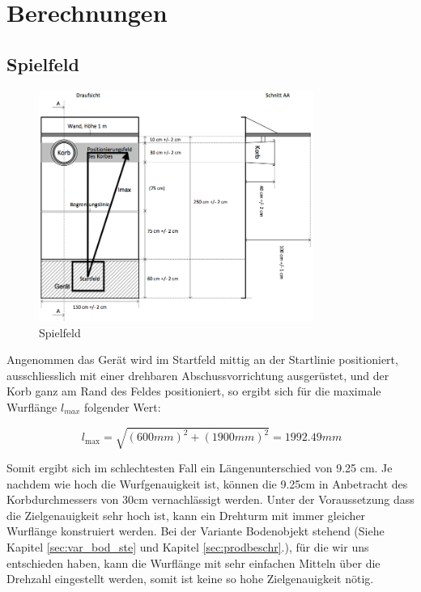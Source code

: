 \section{Berechnungen}
\label{sec:calc}

\subsection{Spielfeld}
\begin{figure}[h!]          
    \centering             
    \includegraphics[width=0.8\textwidth]{fig/Bild_Spielfeld.png}    
    \caption{Spielfeld}
    \label{fig:spielfeld}        
\end{figure}
\noindent
Angenommen das Gerät wird im Startfeld mittig an der Startlinie positioniert, 
ausschliesslich mit einer drehbaren Abschussvorrichtung ausgerüstet, und der 
Korb ganz am Rand des Feldes positioniert, so ergibt sich für die maximale 
Wurflänge $l_{max}$ folgender Wert: 

\[\ l_\text{max} = \sqrt{(600mm)^2 + (1900mm)^2} = 1992.49mm \]


Somit ergibt sich im schlechtesten Fall ein Längenunterschied von  9.25 cm. 
Je nachdem wie hoch die Wurfgenauigkeit ist, können die 9.25cm in 
Anbetracht des Korbdurchmessers von 30cm vernachlässigt werden. Unter der Voraussetzung 
dass die Zielgenauigkeit sehr hoch ist, kann ein Drehturm mit immer gleicher Wurflänge 
konstruiert werden. Bei der Variante Bodenobjekt stehend (Siehe Kapitel 
\ref{sec:var_bod_ste} und Kapitel \ref{sec:prodbeschr}.), für die wir 
uns entschieden haben, kann die Wurflänge mit sehr einfachen Mitteln über die Drehzahl
eingestellt werden, somit ist keine so hohe Zielgenauigkeit nötig.

